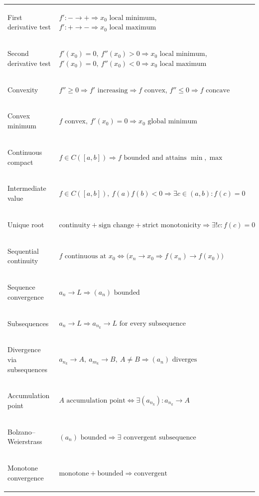 {\begin{minipage}[t]{0.495\textwidth}
\begin{tabular}{
    @{}
    >{\bfseries\raggedright\arraybackslash}p{2.9cm}
    >{\raggedright\arraybackslash}p{10.5cm}
    @{}
}
First derivative test &
$f':-\to+ \Rightarrow x_0\text{ local minimum}$,
\qquad
$f':+\to- \Rightarrow x_0\text{ local maximum}$ \\

Second derivative test &
$f'(x_0)=0,\ f''(x_0)>0 \Rightarrow x_0\text{ local minimum}$,
\quad
$f'(x_0)=0,\ f''(x_0)<0 \Rightarrow x_0\text{ local maximum}$ \\

Convexity &
$f''\ge0 \Rightarrow f'\text{ increasing}\Rightarrow f\text{ convex}$,
\qquad
$f''\le0 \Rightarrow f\text{ concave}$ \\

Convex minimum &
$f\text{ convex},\ f'(x_0)=0
\Rightarrow x_0\text{ global minimum}$ \\

Continuous compact &
$f\in C([a,b])
\Rightarrow f\text{ bounded and attains }\min,\max$ \\

Intermediate value &
$f\in C([a,b]),\ f(a)f(b)<0
\Rightarrow \exists c\in(a,b):f(c)=0$ \\

Unique root &
$\text{continuity}+\text{sign change}+\text{strict monotonicity}
\Rightarrow \exists!c:f(c)=0$ \\

Sequential continuity &
$f\text{ continuous at }x_0
\Longleftrightarrow
\bigl(x_n\to x_0\Rightarrow f(x_n)\to f(x_0)\bigr)$ \\

Sequence convergence &
$a_n\to L
\Rightarrow (a_n)\text{ bounded}$ \\

Subsequences &
$a_n\to L
\Rightarrow a_{n_k}\to L
\text{ for every subsequence}$ \\

Divergence via subsequences &
$a_{n_k}\to A,\ a_{m_k}\to B,\ A\neq B
\Rightarrow (a_n)\text{ diverges}$ \\

Accumulation point &
$A\text{ accumulation point}
\Longleftrightarrow
\exists(a_{n_k}):a_{n_k}\to A$ \\

Bolzano--Weierstrass &
$(a_n)\text{ bounded}
\Rightarrow \exists\text{ convergent subsequence}$ \\

Monotone convergence &
$\text{monotone}+\text{bounded}
\Rightarrow \text{convergent}$ \\


\end{tabular}
\end{minipage}}
